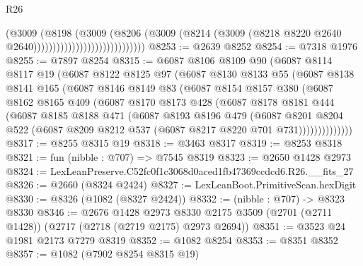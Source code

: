 \begin{lexlean}{R26}
\begin{coremodule}
                                              (@3009
                                                (@8198
                                                  (@3009
                                                    (@8206
                                                      (@3009
                                                        (@8214
                                                          (@3009
                                                            (@8218
                                                              @8220
                                                              @2640
                                                              @2640)))))))))))))))))))))))))))))
@8253 := @2639 @8252
@8254 := @7318 @1976
@8255 := @7897 @8254
@8315 := @6087
    @8106
    @8109
    @90
    (@6087
      @8114
      @8117
      @19
      (@6087
        @8122
        @8125
        @97
        (@6087
          @8130
          @8133
          @55
          (@6087
            @8138
            @8141
            @165
            (@6087
              @8146
              @8149
              @83
              (@6087
                @8154
                @8157
                @380
                (@6087
                  @8162
                  @8165
                  @409
                  (@6087
                    @8170
                    @8173
                    @428
                    (@6087
                      @8178
                      @8181
                      @444
                      (@6087
                        @8185
                        @8188
                        @471
                        (@6087
                          @8193
                          @8196
                          @479
                          (@6087
                            @8201
                            @8204
                            @522
                            (@6087 @8209 @8212 @537 (@6087 @8217 @8220 @701 @731))))))))))))))
@8317 := @8255 @8315 @19
@8318 := @3463 @8317
@8319 := @8253 @8318
@8321 := fun (nibble : @707) => @7545 @8319
@8323 := @2650 @1428 @2973
@8324 := LexLeanPreserve.C52fc0f1c3068d0aced1fb47369ccdcd6.R26.__fits_27
@8326 := @2660 (@8324 @2424)
@8327 := LexLeanBoot.PrimitiveScan.hexDigit
@8330 := @8326 (@1082 (@8327 @2424))
@8332 := (nibble : @707) -> @8323 @8330
@8346 := @2676
    @1428
    @2973
    @8330
    @2175
    @3509
    (@2701 (@2711 @1428))
    (@2717 (@2718 (@2719 @2175) @2973 @2694))
@8351 := @3523 @24 @1981 @2173 @7279 @8319
@8352 := @1082 @8254
@8353 := @8351 @8352
@8357 := @1082 (@7902 @8254 @8315 @19)

\end{coremodule}
\end{lexlean}
